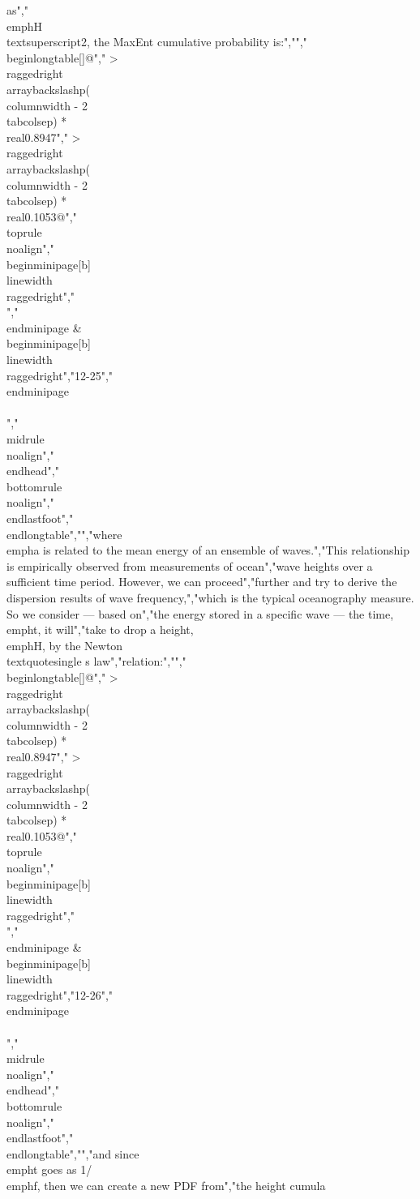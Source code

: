 {{{{{{{{{{as","\\emph{H}\\textsuperscript{2}, the MaxEnt cumulative probability is:","","\\begin{longtable}[]{@{}","  >{\\raggedright\\arraybackslash}p{(\\columnwidth - 2\\tabcolsep) * \\real{0.8947}}","  >{\\raggedright\\arraybackslash}p{(\\columnwidth - 2\\tabcolsep) * \\real{0.1053}}@{}}","\\toprule\\noalign{}","\\begin{minipage}[b]{\\linewidth}\\raggedright","\\[P(H) = \\ e^{- aH^{2}}\\]","\\end{minipage} & \\begin{minipage}[b]{\\linewidth}\\raggedright","12-25","\\end{minipage} \\\\","\\midrule\\noalign{}","\\endhead","\\bottomrule\\noalign{}","\\endlastfoot","\\end{longtable}","","where \\emph{a} is related to the mean energy of an ensemble of waves.","This relationship is empirically observed from measurements of ocean","wave heights over a sufficient time period. However, we can proceed","further and try to derive the dispersion results of wave frequency,","which is the typical oceanography measure. So we consider --- based on","the energy stored in a specific wave --- the time, \\emph{t}, it will","take to drop a height, \\emph{H}, by the Newton\\textquotesingle s law","relation:","","\\begin{longtable}[]{@{}","  >{\\raggedright\\arraybackslash}p{(\\columnwidth - 2\\tabcolsep) * \\real{0.8947}}","  >{\\raggedright\\arraybackslash}p{(\\columnwidth - 2\\tabcolsep) * \\real{0.1053}}@{}}","\\toprule\\noalign{}","\\begin{minipage}[b]{\\linewidth}\\raggedright","\\[t^{2}\\ \\sim\\ H\\]","\\end{minipage} & \\begin{minipage}[b]{\\linewidth}\\raggedright","12-26","\\end{minipage} \\\\","\\midrule\\noalign{}","\\endhead","\\bottomrule\\noalign{}","\\endlastfoot","\\end{longtable}","","and since \\emph{t} goes as 1/\\emph{f}, then we can create a new PDF from","the height cumula}}}}}}}}}}
